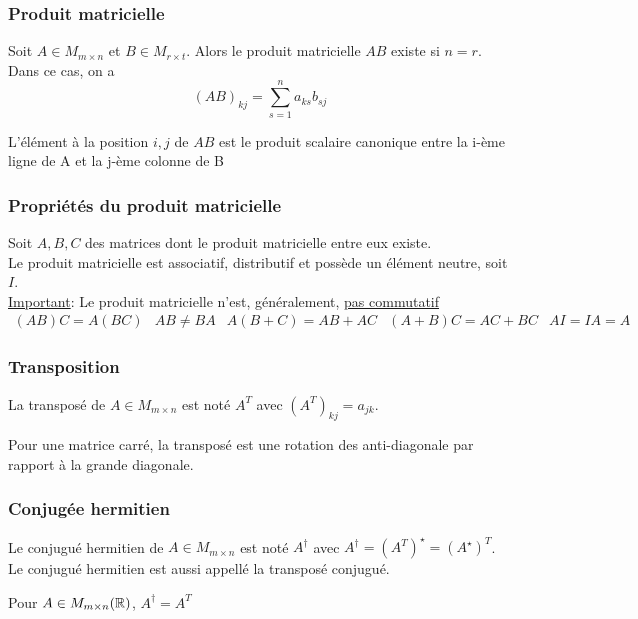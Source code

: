 \subsubsection{Produit matricielle}
Soit $A \in M_{m \times n}$ et $B \in M_{r \times t}$. Alors
le produit matricielle $AB$ existe si $n = r$. Dans ce cas, on a \[
    (AB)_{kj} = \sum_{s = 1}^{n} a_{ks} b_{sj}
\]
\begin{remark}
    L'élément à la position $i, j$ de $AB$ est le produit scalaire canonique entre la i-ème ligne
    de A et la j-ème colonne de B
\end{remark}

\subsubsection{Propriétés du produit matricielle}
Soit $A, B, C$ des matrices dont le produit matricielle entre eux existe. \\
Le produit matricielle est associatif, distributif et possède un élément neutre, soit $I$. \\
\underline{Important}: Le produit matricielle n'est, généralement, \underline{pas commutatif}
\[
    \begin{matrix}
        (AB)C = A(BC) & AB \neq BA & A(B + C) = AB + AC & (A + B)C = AC + BC & AI = IA = A
    \end{matrix}
\]

\subsubsection{Transposition}
\begin{definition}
    La transposé de $A \in M_{m \times n}$ est noté $A^T$ avec $\left(A^T\right)_{kj} = a_{jk}$.
    \begin{remark}
        Pour une matrice carré, la transposé est une rotation des anti-diagonale par rapport à la grande diagonale.
    \end{remark}
\end{definition}

\subsubsection{Conjugée hermitien}
\begin{definition}
    Le conjugué hermitien de $A \in M_{m \times n}$ est noté $A^\dagger$ avec $A^\dagger = \left(A^T\right)^\star = \left(A^\star\right)^T$.
    Le conjugué hermitien est aussi appellé la transposé conjugué.
    \begin{remark}
        Pour $A \in M_{m \times n}(\mathbb{R})$, $A^\dagger = A^T$
    \end{remark}
\end{definition}

